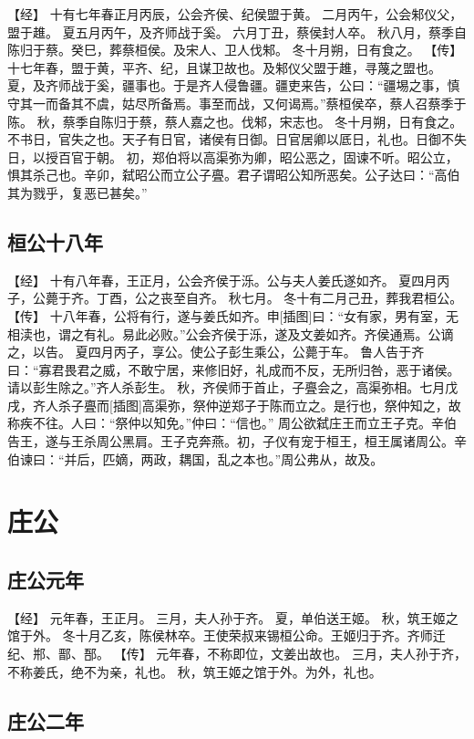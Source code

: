 \documentclass[a4paper,12pt,UTF8,twoside]{ctexbook}
\begin{document}
【经】
十有七年春正月丙辰，公会齐侯、纪侯盟于黄。
二月丙午，公会邾仪父，盟于趡。
夏五月丙午，及齐师战于奚。
六月丁丑，蔡侯封人卒。
秋八月，蔡季自陈归于蔡。癸巳，葬蔡桓侯。及宋人、卫人伐邾。
冬十月朔，日有食之。
【传】
十七年春，盟于黄，平齐、纪，且谋卫故也。及邾仪父盟于趡，寻蔑之盟也。
夏，及齐师战于奚，疆事也。于是齐人侵鲁疆。疆吏来告，公曰：“疆埸之事，慎守其一而备其不虞，姑尽所备焉。事至而战，又何谒焉。”蔡桓侯卒，蔡人召蔡季于陈。
秋，蔡季自陈归于蔡，蔡人嘉之也。伐邾，宋志也。
冬十月朔，日有食之。不书日，官失之也。天子有日官，诸侯有日御。日官居卿以厎日，礼也。日御不失日，以授百官于朝。
初，郑伯将以高渠弥为卿，昭公恶之，固谏不听。昭公立，惧其杀己也。辛卯，弑昭公而立公子亹。君子谓昭公知所恶矣。公子达曰：“高伯其为戮乎，复恶已甚矣。”

\section{桓公十八年}

【经】
十有八年春，王正月，公会齐侯于泺。公与夫人姜氏遂如齐。
夏四月丙子，公薨于齐。丁酉，公之丧至自齐。
秋七月。
冬十有二月己丑，葬我君桓公。
【传】
十八年春，公将有行，遂与姜氏如齐。申[插图]曰：“女有家，男有室，无相渎也，谓之有礼。易此必败。”公会齐侯于泺，遂及文姜如齐。齐侯通焉。公谪之，以告。
夏四月丙子，享公。使公子彭生乘公，公薨于车。
鲁人告于齐曰：“寡君畏君之威，不敢宁居，来修旧好，礼成而不反，无所归咎，恶于诸侯。请以彭生除之。”齐人杀彭生。
秋，齐侯师于首止，子亹会之，高渠弥相。七月戊戌，齐人杀子亹而[插图]高渠弥，祭仲逆郑子于陈而立之。是行也，祭仲知之，故称疾不往。人曰：“祭仲以知免。”仲曰：“信也。”
周公欲弑庄王而立王子克。辛伯告王，遂与王杀周公黑肩。王子克奔燕。初，子仪有宠于桓王，桓王属诸周公。辛伯谏曰：“并后，匹嫡，两政，耦国，乱之本也。”周公弗从，故及。

\chapter{庄公}

\section{庄公元年}

【经】
元年春，王正月。
三月，夫人孙于齐。
夏，单伯送王姬。
秋，筑王姬之馆于外。
冬十月乙亥，陈侯林卒。王使荣叔来锡桓公命。王姬归于齐。齐师迁纪、郱、鄑、郚。
【传】
元年春，不称即位，文姜出故也。
三月，夫人孙于齐，不称姜氏，绝不为亲，礼也。
秋，筑王姬之馆于外。为外，礼也。

\section{庄公二年}
\end{document}
